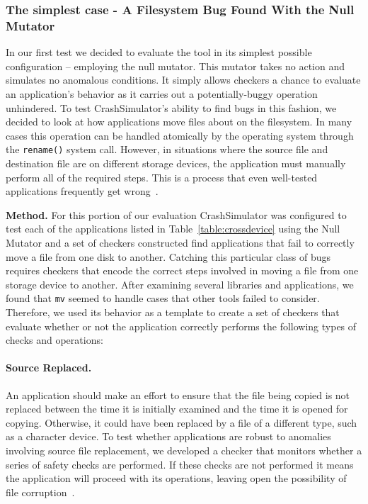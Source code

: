 \subsubsection{The simplest case - A Filesystem Bug Found With the Null Mutator}

In our first test we decided to evaluate the tool in its simplest possible
configuration -- employing the null mutator.
This mutator takes no action and simulates no anomalous conditions.
It simply allows checkers
a chance to evaluate an application's behavior
as it carries out a potentially-buggy operation unhindered.
To test CrashSimulator's ability to find bugs
in this fashion, we decided to look at how applications
move files about on the filesystem.
In many cases this operation can be handled
atomically by the operating system
through the {\tt rename()} system call.
However,
in situations where the source file and destination file
are on different storage devices,
the application must
manually perform all of the required steps.
This is a process
that even well-tested applications
frequently get wrong~\cite{PHPRenameBug,PythonShutilBug,NodejsCopyBug}.

{\bf Method.}  For this portion of our evaluation
CrashSimulator was configured
to test each of the applications listed in Table~\ref{table:crossdevice}
using the Null Mutator and a set of checkers constructed find applications
that fail to correctly move a file from one disk to another.
Catching this particular class of bugs requires
checkers that encode the correct steps involved in moving a file from one
storage device to another.
After examining several libraries and applications,
we found that
{\tt mv} seemed to handle cases that other tools failed to consider.
Therefore, we
used its behavior as a template to create a set of checkers
that evaluate whether or not
the application correctly performs the following
types of checks and operations:

\paragraph{Source Replaced.}

An application should make an effort
to ensure that the file being copied
is not replaced between the time it is initially examined
and the time it is opened for copying.
Otherwise,
it could have been replaced by a file of a different type,
such as a character device.
To test whether applications are robust
to anomalies involving source file replacement,
we developed a checker that monitors whether a series of safety checks
are performed.
If these checks are not performed it
means the application will proceed with its operations,
leaving open the possibility of file corruption~\cite{PythonShutilBug}.


